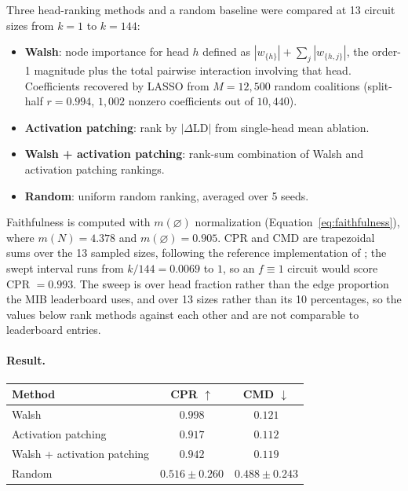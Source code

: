 \documentclass{article}
\begin{document}
Three head-ranking methods and a random baseline were compared at 13
circuit sizes from $k = 1$ to $k = 144$:

\begin{itemize}
\item \textbf{Walsh}: node importance for head $h$ defined as
  $|w_{\{h\}}| + \sum_j |w_{\{h,j\}}|$, the order-1 magnitude plus
  the total pairwise interaction involving that head. Coefficients
  recovered by LASSO from $M = 12{,}500$ random coalitions
  (split-half $r = 0.994$, $1{,}002$ nonzero coefficients out of
  $10{,}440$).
\item \textbf{Activation patching}: rank by $|\Delta\text{LD}|$ from
  single-head mean ablation.
\item \textbf{Walsh + activation patching}: rank-sum combination of
  Walsh and activation patching rankings.
\item \textbf{Random}: uniform random ranking, averaged over 5 seeds.
\end{itemize}

Faithfulness is computed with $m(\varnothing)$ normalization
(Equation~\ref{eq:faithfulness}), where $m(N) = 4.378$ and
$m(\varnothing) = 0.905$. CPR and CMD are trapezoidal sums over the 13
sampled sizes, following the reference implementation of
\citet{mueller2025mib}; the swept interval runs from $k/144 = 0.0069$ to
$1$, so an $f \equiv 1$ circuit would score CPR $= 0.993$. The sweep is
over head fraction rather than the edge proportion the MIB leaderboard
uses, and over 13 sizes rather than its 10 percentages, so the values
below rank methods against each other and are not comparable to
leaderboard entries.

\paragraph{Result.}

\medskip

\begin{tabular}{lcc}
\toprule
Method & CPR $\uparrow$ & CMD $\downarrow$ \\
\midrule
Walsh                              & $0.998$ & $0.121$ \\
Activation patching                & $0.917$ & $0.112$ \\
Walsh + activation patching        & $0.942$ & $0.119$ \\
Random                             & $0.516 \pm 0.260$ & $0.488 \pm 0.243$ \\
\bottomrule
\end{tabular}
\end{document}
